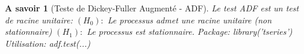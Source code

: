 \documentclass{article}
\newtheorem*{asavoir}{A savoir}
\begin{document}
\begin{asavoir}[Teste de Dickey-Fuller Augmenté - ADF]
Le test ADF est un test de racine unitaire:
\newline
$(H_0):$ Le processus admet une racine unitaire (non stationnaire)
\newline
$(H_1):$ Le processus est stationnaire.
\newline
Package: library('tseries')
\newline
Utilisation: adf.test(...)
\end{asavoir}
\end{document}
